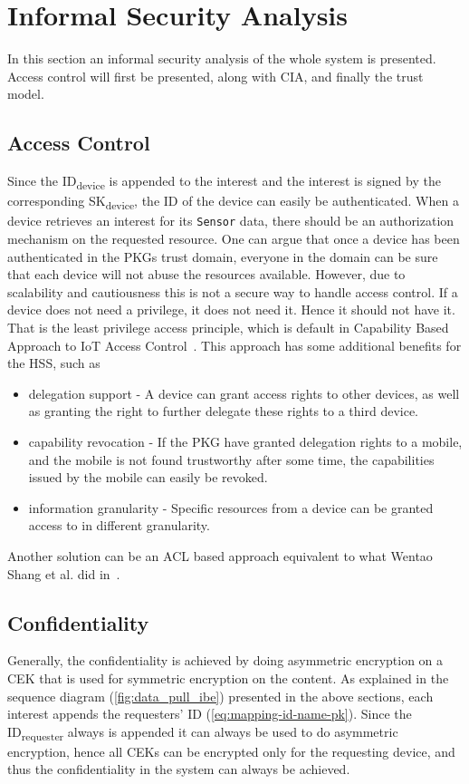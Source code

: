 \section{Informal Security Analysis}
In this section an informal security analysis of the whole system is presented.
Access control will first be presented, along with \gls{CIA}, and finally the trust model.

\subsection{Access Control}\label{access_control}
Since the ID\textsubscript{device} is appended to the \gls{interest} and the \gls{interest} is signed by the corresponding SK\textsubscript{device}, the \gls{ID} of the device can easily be authenticated. 
When a device retrieves an \gls{interest} for its \texttt{Sensor} \gls{data}, there should be an authorization mechanism on the requested resource. 
One can argue that once a device has been authenticated in the \gls{PKG}s trust domain, everyone in the domain can be sure that each device will not abuse the resources available. 
However, due to scalability and cautiousness this is not a secure way to handle access control. 
If a device does not need a privilege, it does not need it.
Hence it should not have it. 
That is the least privilege access principle, which is default in Capability Based Approach to \gls{IoT} Access Control~\cite{DBLP:conf/imis/GusmeroliPR12}.
This approach has some additional benefits for the \gls{HSS}, such as

\begin{itemize}
  \item delegation support - 
  A device can grant access rights to other devices, as well as granting the right to further delegate these rights to a third device.
  \item capability revocation - 
  If the \gls{PKG} have granted delegation rights to a mobile, and the mobile is not found trustworthy after some time, the capabilities issued by the mobile can easily be revoked.
  \item information granularity - 
  Specific resources from a device can be granted access to in different granularity.
\end{itemize}

Another solution can be an \gls{ACL} based approach equivalent to what Wentao Shang et al. did in~\cite{DBLP:journals/network/ShangDMBZ14}.

\subsection{Confidentiality}
Generally, the confidentiality is achieved by doing asymmetric encryption on a \gls{CEK} that is used for symmetric encryption on the content.
As explained in the sequence diagram (\autoref{fig:data_pull_ibe}) presented in the above sections, each \gls{interest} appends the requesters' ID (\autoref{eq:mapping-id-name-pk}).
Since the ID\textsubscript{requester} always is appended it can always be used to do asymmetric encryption, hence all \gls{CEK}s can be encrypted only for the requesting device, and thus the confidentiality in the system can always be achieved.

